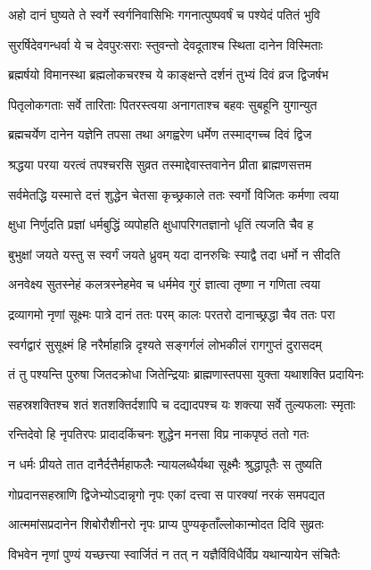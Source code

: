 \twolineshloka
{अहो दानं घुष्यते ते स्वर्गे स्वर्गनिवासिभिः}
{गगनात्पुष्पवर्षं च पश्येदं पतितं भुवि}


\twolineshloka
{सुरर्षिदेवगन्धर्वा ये च देवपुरःसराः}
{स्तुवन्तो देवदूताश्च स्थिता दानेन विस्मिताः}


\twolineshloka
{ब्रह्मर्षयो विमानस्था ब्रह्मलोकचरश्च ये}
{काङ्क्षन्ते दर्शनं तुभ्यं दिवं व्रज द्विजर्षभ}


\twolineshloka
{पितृलोकगताः सर्वे तारिताः पितरस्त्वया}
{अनागताश्च बहवः सुबहूनि युगान्युत}


\twolineshloka
{ब्रह्मचर्येण दानेन यज्ञेनि तपसा तथा}
{अगह्वरेण धर्मेण तस्माद्गच्च दिवं द्विज}


\twolineshloka
{श्रद्धया परया यरत्वं तपश्चरसि सुव्रत}
{तस्माद्देवास्तवानेन प्रीता ब्राह्मणसत्तम}


\twolineshloka
{सर्वमेतद्धि यस्मात्ते दत्तं शुद्धेन चेतसा}
{कृच्छ्रकाले ततः स्वर्गो विजितः कर्मणा त्वया}


\twolineshloka
{क्षुधा निर्णुदति प्रज्ञां धर्मबुद्धिं व्यपोहति}
{क्षुधापरिगतज्ञानो धृतिं त्यजति चैव ह}


\twolineshloka
{बुभुक्षां जयते यस्तु स स्वर्गं जयते ध्रुवम्}
{यदा दानरुचिः स्याद्वै तदा धर्मो न सीदति}


\twolineshloka
{अनवेक्ष्य सुतस्नेहं कलत्रस्नेहमेव च}
{धर्ममेव गुरं ज्ञात्वा तृष्णा न गणिता त्वया}


\twolineshloka
{द्रव्यागमो नृणां सूक्ष्मः पात्रे दानं ततः परम्}
{कालः परतरो दानाच्छ्रद्धा चैव ततः परा}


\twolineshloka
{स्वर्गद्वारं सुसूक्ष्मं हि नरैर्माहान्नि दृश्यते}
{सङ्गर्गलं लोभकीलं रागगुप्तं दुरासदम्}


\twolineshloka
{तं तु पश्यन्ति पुरुषा जितदक्रोधा जितेन्द्रियाः}
{ब्राह्मणास्तपसा युक्ता यथाशक्ति प्रदायिनः}


\twolineshloka
{सहस्रशक्तिश्च शतं शतशक्तिर्दशापि च}
{दद्यादपश्च यः शक्त्या सर्वे तुल्यफलाः स्मृताः}


\twolineshloka
{रन्तिदेवो हि नृपतिरपः प्रादादकिंचनः}
{शुद्धेन मनसा विप्र नाकपृष्ठं ततो गतः}


\twolineshloka
{न धर्मः प्रीयते तात दानैर्दत्तैर्महाफलैः}
{न्यायलब्धैर्यथा सूक्ष्मैः श्रुद्धापूतैः स तुष्यति}


\twolineshloka
{गोप्रदानसहस्राणि द्विजेभ्योऽदान्नृगो नृपः}
{एकां दत्त्वा स पारक्यां नरकं समपद्यत}


\twolineshloka
{आत्ममांसप्रदानेन शिबोरौशीनरो नृपः}
{प्राप्य पुण्यकृताँल्लोकान्मोदत दिवि सुव्रतः}


\twolineshloka
{विभवेन नृणां पुण्यं यच्छत्त्या स्वार्जितं न तत्}
{न यज्ञैर्विविधैर्विप्र यथान्यायेन संचितैः}


